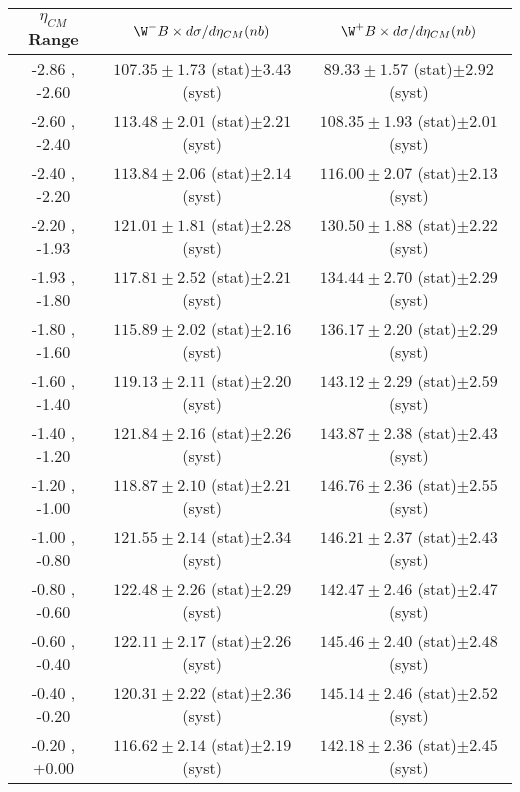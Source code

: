 \begin{table}[h!]
  \centering
  \renewcommand{\arraystretch}{1.5}
  \begin{tabular}{|c|*2c|}
    \hline
    $\eta_{CM}$ Range & $\W^{-} B \times d\sigma/d\eta_{CM} (nb)$ & $\W^{+} B \times d\sigma/d\eta_{CM} (nb)$\\
    \hline\hline
    -2.86 , -2.60 & $107.35 \pm 1.73$ (stat)$ \pm 3.43$ (syst) & $89.33 \pm 1.57$ (stat)$ \pm 2.92$ (syst)\\
    \hline
    -2.60 , -2.40 & $113.48 \pm 2.01$ (stat)$ \pm 2.21$ (syst) & $108.35 \pm 1.93$ (stat)$ \pm 2.01$ (syst)\\
    \hline
    -2.40 , -2.20 & $113.84 \pm 2.06$ (stat)$ \pm 2.14$ (syst) & $116.00 \pm 2.07$ (stat)$ \pm 2.13$ (syst)\\
    \hline
    -2.20 , -1.93 & $121.01 \pm 1.81$ (stat)$ \pm 2.28$ (syst) & $130.50 \pm 1.88$ (stat)$ \pm 2.22$ (syst)\\
    \hline
    -1.93 , -1.80 & $117.81 \pm 2.52$ (stat)$ \pm 2.21$ (syst) & $134.44 \pm 2.70$ (stat)$ \pm 2.29$ (syst)\\
    \hline
    -1.80 , -1.60 & $115.89 \pm 2.02$ (stat)$ \pm 2.16$ (syst) & $136.17 \pm 2.20$ (stat)$ \pm 2.29$ (syst)\\
    \hline
    -1.60 , -1.40 & $119.13 \pm 2.11$ (stat)$ \pm 2.20$ (syst) & $143.12 \pm 2.29$ (stat)$ \pm 2.59$ (syst)\\
    \hline
    -1.40 , -1.20 & $121.84 \pm 2.16$ (stat)$ \pm 2.26$ (syst) & $143.87 \pm 2.38$ (stat)$ \pm 2.43$ (syst)\\
    \hline
    -1.20 , -1.00 & $118.87 \pm 2.10$ (stat)$ \pm 2.21$ (syst) & $146.76 \pm 2.36$ (stat)$ \pm 2.55$ (syst)\\
    \hline
    -1.00 , -0.80 & $121.55 \pm 2.14$ (stat)$ \pm 2.34$ (syst) & $146.21 \pm 2.37$ (stat)$ \pm 2.43$ (syst)\\
    \hline
    -0.80 , -0.60 & $122.48 \pm 2.26$ (stat)$ \pm 2.29$ (syst) & $142.47 \pm 2.46$ (stat)$ \pm 2.47$ (syst)\\
    \hline
    -0.60 , -0.40 & $122.11 \pm 2.17$ (stat)$ \pm 2.26$ (syst) & $145.46 \pm 2.40$ (stat)$ \pm 2.48$ (syst)\\
    \hline
    -0.40 , -0.20 & $120.31 \pm 2.22$ (stat)$ \pm 2.36$ (syst) & $145.14 \pm 2.46$ (stat)$ \pm 2.52$ (syst)\\
    \hline
    -0.20 , +0.00 & $116.62 \pm 2.14$ (stat)$ \pm 2.19$ (syst) & $142.18 \pm 2.36$ (stat)$ \pm 2.45$ (syst)\\
    \hline

\end{tabular}
\end{table}
